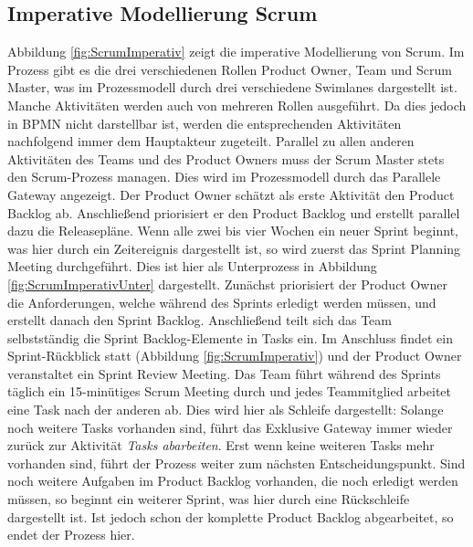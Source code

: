 \subsection{Imperative Modellierung Scrum}

Abbildung \ref{fig:ScrumImperativ} zeigt die imperative Modellierung von Scrum. Im Prozess gibt es die drei verschiedenen Rollen Product Owner, Team und Scrum Master, was im Prozessmodell durch drei verschiedene Swimlanes dargestellt ist. Manche Aktivitäten werden auch von mehreren Rollen ausgeführt. Da dies jedoch in BPMN nicht darstellbar ist, werden die entsprechenden Aktivitäten nachfolgend immer dem Hauptakteur zugeteilt.\newline
Parallel zu allen anderen Aktivitäten des Teams und des Product Owners muss der Scrum Master stets den Scrum-Prozess managen. Dies wird im Prozessmodell durch das Parallele Gateway angezeigt. \newline
Der Product Owner schätzt als erste Aktivität den Product Backlog ab. Anschließend priorisiert er den Product Backlog und erstellt parallel dazu die Releasepläne. \newline
Wenn alle zwei bis vier Wochen ein neuer Sprint beginnt, was hier durch ein Zeitereignis dargestellt ist, so wird zuerst das Sprint Planning Meeting durchgeführt. Dies ist hier als Unterprozess in Abbildung \ref{fig:ScrumImperativUnter} dargestellt. Zunächst priorisiert der Product Owner die Anforderungen, welche während des Sprints erledigt werden müssen, und erstellt danach den Sprint Backlog. Anschließend teilt sich das Team selbstständig die Sprint Backlog-Elemente in Tasks ein.\newline
Im Anschluss findet ein Sprint-Rückblick statt (Abbildung \ref{fig:ScrumImperativ}) und der Product Owner veranstaltet ein Sprint Review Meeting.\newline
Das Team führt während des Sprints täglich ein 15-minütiges Scrum Meeting durch und jedes Teammitglied arbeitet eine Task nach der anderen ab. Dies wird hier als Schleife dargestellt: Solange noch weitere Tasks vorhanden sind, führt das Exklusive Gateway immer wieder zurück zur Aktivität \textit{Tasks abarbeiten}. Erst wenn keine weiteren Tasks mehr vorhanden sind, führt der Prozess weiter zum nächsten Entscheidungspunkt.\newline
Sind noch weitere Aufgaben im Product Backlog vorhanden, die noch erledigt werden müssen, so beginnt ein weiterer Sprint, was hier durch eine Rückschleife dargestellt ist. Ist jedoch schon der komplette Product Backlog abgearbeitet, so endet der Prozess hier.


